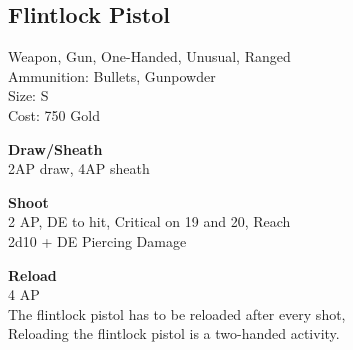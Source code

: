\subsection{Flintlock Pistol}\label{weapon:flintlockPistol}
Weapon, Gun, One-Handed, Unusual, Ranged\\
Ammunition: Bullets, Gunpowder\\
Size: S\\
Cost: 750 Gold

\textbf{Draw/Sheath} \\
2AP draw, 4AP sheath

\textbf{Shoot} \\
2 AP, DE to hit, Critical on 19 and 20,  Reach\\
2d10 + DE Piercing Damage

\textbf{Reload} \\
4 AP\\
The flintlock pistol has to be reloaded after every shot,\\
Reloading the flintlock pistol is a two-handed activity.
